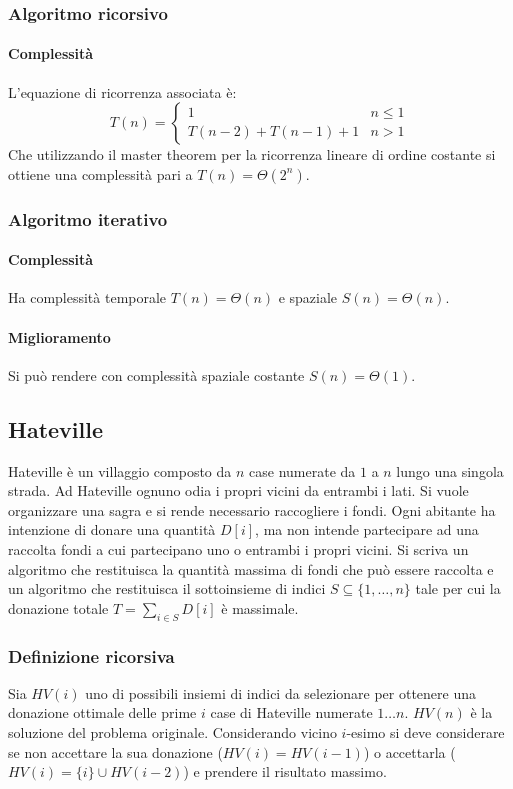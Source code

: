 \subsubsection{Algoritmo ricorsivo}

\paragraph{Complessit\`a}
L'equazione di ricorrenza associata \`e:
$$
T(n)=
\begin{cases}
1\quad & n\le 1\\
T(n-2) + T(n-1) + 1& n>1
\end{cases}
$$
Che utilizzando il master theorem per la ricorrenza lineare di ordine costante si ottiene una complessit\`a pari a $T(n)=\Theta(2^n)$.
\subsubsection{Algoritmo iterativo}

\paragraph{Complessit\`a}
Ha complessit\`a temporale $T(n)=\Theta(n)$ e spaziale $S(n)=\Theta(n)$.
\paragraph{Miglioramento}
Si pu\`o rendere con complessit\`a spaziale costante $S(n)=\Theta(1)$.

\subsection{Hateville}
Hateville \`e un villaggio composto da $n$ case numerate da $1$ a $n$ lungo una singola strada. Ad Hateville ognuno odia i propri vicini da entrambi i lati. Si vuole organizzare una sagra e si rende necessario
raccogliere i fondi. Ogni abitante ha intenzione di donare una quantit\`a $D[i]$, ma non intende partecipare ad una raccolta fondi a cui partecipano uno o entrambi i propri vicini. Si scriva un algoritmo che 
restituisca la quantit\`a massima di fondi che pu\`o essere raccolta e un algoritmo che restituisca il sottoinsieme di indici $S\subseteq\{1, \dots, n\}$ tale per cui la donazione totale $T=\sum\limits_{i\in S}D[i]$
\`e massimale.
\subsubsection{Definizione ricorsiva}
Sia $HV(i)$ uno di possibili insiemi di indici da selezionare per ottenere una donazione ottimale delle prime $i$ case di Hateville numerate $1\dots n$. $HV(n)$ \`e la soluzione del problema originale. 
Considerando vicino $i$-esimo si deve considerare se non accettare la sua donazione ($HV(i)=HV(i-1)$) o accettarla ($HV(i) = \{i\}\cup HV(i-2)$) e prendere il risultato massimo. 
